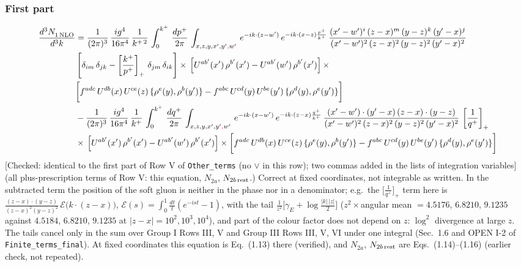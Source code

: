 \documentclass[9pt]{article}
\numberwithin{equation}{section}
\begin{document}
\subsubsection*{First part}
\begin{align}
     \frac{d^{3}N_{1\,\rm NLO}^{\rm}}{d^{3}k}  & =  \frac{1}{(2\pi)^{3}}\, \frac{ig^{4}}{16\pi^{4}}\, \frac{1}{k^{+\,2}}\,\int_{0}^{k^{+}}\, \frac{dp^{+}}{2\pi}\,\int_{x,z,y,x',y'{\color{red},}w'}\,e^{-ik\cdot (z-w^\prime)}\,e^{-ik\cdot (x-z)\frac{p^{+}}{k^{+}}}\,\frac{(x'-w')^{i}\,(z-x)^{m}\,(y-z)^{k}\,(y'-x)^{j}}{(x'-w')^{2}\,(z-x)^{2}\,(y-z)^{2}\,(y'-x)^{2}}\,\notag \\ & \left[\delta_{im}\,\delta_{jk}-\left[\frac{k^{+}}{p^{+}}\right]_{+}\, \delta_{jm}\,\delta_{ik}\right]\times\, \left[U^{ab'}(x')\,\rho^{b'}(x')-U^{ab'}(w')\,\rho^{b'}(x')\right]\times\notag \\ & \bigg[f^{adc}\,U^{db}(x)\,U^{ce}(z)\, \{\rho^{e}(y),\rho^{b}(y')\}-f^{abc}\,U^{cd}(y)\,U^{be}(y')\, \{\rho^{d}(y),\rho^{e}(y')\}\bigg] \notag \\ & -\frac{1}{(2\pi)^{3}}\, \frac{ig^{4}}{16\pi^{4}}\, \frac{1}{k^{+}}\,\int_{0}^{k^{+}}\, \frac{dq^{+}}{2\pi}\,\int_{x,z,y,x',y'{\color{red},}w'}\,e^{-ik\cdot (x-w^\prime)}\,e^{-ik\cdot (z-x)\frac{q^{+}}{k^{+}}}\,\frac{(x'-w')\cdot (y'-x)\,(z-x)\cdot (y-z)}{(x'-w')^{2}\,(z-x)^{2}\,(y-z)^{2}\,(y'-x)^{2}}\,\left[\frac{1}{q^{+}}\right]_{+}\notag \\ & \times\, \left[U^{ab'}(x')\,\rho^{b'}(x')-U^{ab'}(w')\,\rho^{b'}(x')\right]\times \bigg[f^{adc}\,U^{db}(x)\,U^{ce}(z)\, \{\rho^{e}(y),\rho^{b}(y')\}-f^{abc}\,U^{cd}(y)\,U^{be}(y')\, \{\rho^{d}(y),\rho^{e}(y')\}\bigg]
\end{align} {\color{red}[Checked: identical to the first part of Row V of \texttt{Other\_terms} (no $\vee$ in this row); two commas added in the lists of integration variables]} {\color{magenta} (all plus-prescription terms of Row V: this equation, $N_{2a}$, $N_{2b\,\rm rest}$.) Correct at fixed coordinates, not integrable as written. In the subtracted term the position of the soft gluon is neither in the phase nor in a denominator; e.g.\ the $\big[\frac{1}{q^{+}}\big]_{+}$ term here is $\frac{(z-x)\cdot(y-z)}{(z-x)^{2}(y-z)^{2}}\,\mathcal{E}\big(k\cdot(z-x)\big)$, $\mathcal{E}(s)=\int_{0}^{1}\frac{dt}{t}(e^{-ist}-1)$, with the tail $\frac{1}{z^{2}}\big[\gamma_{E}+\log\frac{|k|\,|z|}{2}\big]$ ($z^{2}\times$angular mean $=4.5176$, $6.8210$, $9.1235$ against $4.5184$, $6.8210$, $9.1235$ at $|z-x|=10^{2},10^{3},10^{4}$), and part of the colour factor does not depend on $z$: $\log^{2}$ divergence at large $z$. The tails cancel only in the sum over Group I Rows III, V and Group III Rows III, V, VI under one integral (Sec.~1.6 and OPEN I-2 of \texttt{Finite\_terms\_final}). At fixed coordinates this equation is Eq.~(1.13) there (verified), and $N_{2a}$, $N_{2b\,\rm rest}$ are Eqs.~(1.14)--(1.16) (earlier check, not repeated).}\par\noindent
\end{document}

